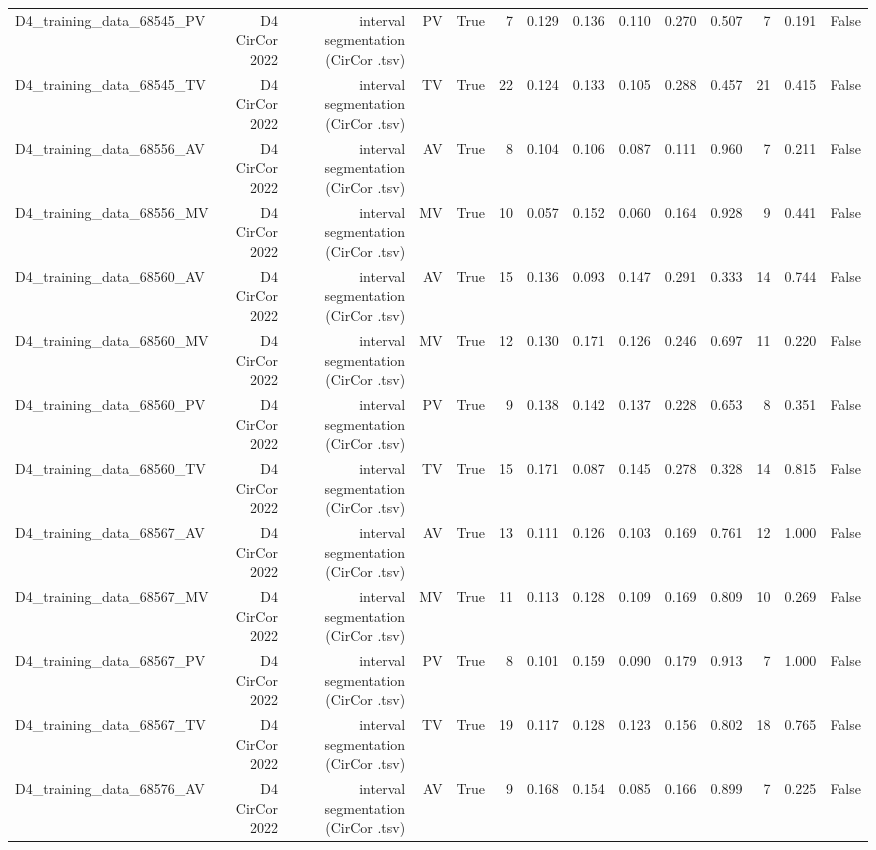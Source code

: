 \begin{table}[htbp]
\begin{tabular}{lrrrrrrrrrrrrr}
    D4\_training\_data\_68545\_PV & D4 CirCor 2022 & interval segmentation (CirCor .tsv) & PV & True & 7 & 0.129 & 0.136 & 0.110 & 0.270 & 0.507 & 7 & 0.191 & False \\
    D4\_training\_data\_68545\_TV & D4 CirCor 2022 & interval segmentation (CirCor .tsv) & TV & True & 22 & 0.124 & 0.133 & 0.105 & 0.288 & 0.457 & 21 & 0.415 & False \\
    D4\_training\_data\_68556\_AV & D4 CirCor 2022 & interval segmentation (CirCor .tsv) & AV & True & 8 & 0.104 & 0.106 & 0.087 & 0.111 & 0.960 & 7 & 0.211 & False \\
    D4\_training\_data\_68556\_MV & D4 CirCor 2022 & interval segmentation (CirCor .tsv) & MV & True & 10 & 0.057 & 0.152 & 0.060 & 0.164 & 0.928 & 9 & 0.441 & False \\
    D4\_training\_data\_68560\_AV & D4 CirCor 2022 & interval segmentation (CirCor .tsv) & AV & True & 15 & 0.136 & 0.093 & 0.147 & 0.291 & 0.333 & 14 & 0.744 & False \\
    D4\_training\_data\_68560\_MV & D4 CirCor 2022 & interval segmentation (CirCor .tsv) & MV & True & 12 & 0.130 & 0.171 & 0.126 & 0.246 & 0.697 & 11 & 0.220 & False \\
    D4\_training\_data\_68560\_PV & D4 CirCor 2022 & interval segmentation (CirCor .tsv) & PV & True & 9 & 0.138 & 0.142 & 0.137 & 0.228 & 0.653 & 8 & 0.351 & False \\
    D4\_training\_data\_68560\_TV & D4 CirCor 2022 & interval segmentation (CirCor .tsv) & TV & True & 15 & 0.171 & 0.087 & 0.145 & 0.278 & 0.328 & 14 & 0.815 & False \\
    D4\_training\_data\_68567\_AV & D4 CirCor 2022 & interval segmentation (CirCor .tsv) & AV & True & 13 & 0.111 & 0.126 & 0.103 & 0.169 & 0.761 & 12 & 1.000 & False \\
    D4\_training\_data\_68567\_MV & D4 CirCor 2022 & interval segmentation (CirCor .tsv) & MV & True & 11 & 0.113 & 0.128 & 0.109 & 0.169 & 0.809 & 10 & 0.269 & False \\
    D4\_training\_data\_68567\_PV & D4 CirCor 2022 & interval segmentation (CirCor .tsv) & PV & True & 8 & 0.101 & 0.159 & 0.090 & 0.179 & 0.913 & 7 & 1.000 & False \\
    D4\_training\_data\_68567\_TV & D4 CirCor 2022 & interval segmentation (CirCor .tsv) & TV & True & 19 & 0.117 & 0.128 & 0.123 & 0.156 & 0.802 & 18 & 0.765 & False \\
    D4\_training\_data\_68576\_AV & D4 CirCor 2022 & interval segmentation (CirCor .tsv) & AV & True & 9 & 0.168 & 0.154 & 0.085 & 0.166 & 0.899 & 7 & 0.225 & False \\

\end{tabular}
\end{table}
